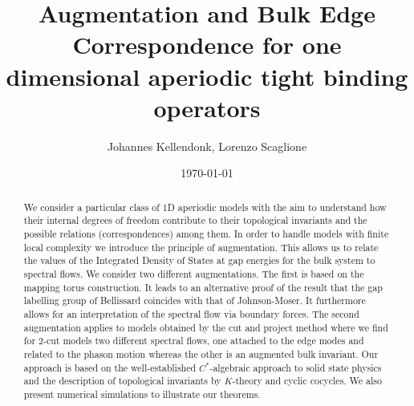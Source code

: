 \documentclass[11pt]{amsart}
\begin{document}
\title[Bulk Edge Correspondence for aperiodic tight binding operators]{Augmentation and Bulk Edge Correspondence for one dimensional aperiodic tight binding operators}
\author{Johannes Kellendonk, Lorenzo Scaglione}
\address{Institut Camille Jordan, Université Claude Bernard Lyon 1, 43 boulevard du 11 novembre 1918, F-69622 Villeurbanne Cedex}



\date{\today}%

\begin{abstract}
	We consider a particular class of 1D aperiodic models with the aim to understand how their internal degrees of freedom contribute to their topological invariants and the possible relations (correspondences) among them. In order to handle models with finite local complexity we introduce the principle of augmentation. This allows us to relate the values of the Integrated Density of States at gap energies for the bulk system to spectral flows. We consider two different augmentations. The first is based on the mapping torus construction. It leads to an alternative proof of the result that the gap labelling group of Bellissard coincides with that of Johnson-Moser. It furthermore allows for an interpretation of the spectral flow via boundary forces. The second augmentation applies to models obtained by the cut and project method where we find for 2-cut models two different spectral flows, one attached to the edge modes and related to the phason motion whereas the other is an augmented bulk invariant.  
	Our approach is based on the well-established $C^*$-algebraic approach to solid state physics and the description of topological invariants by $K$-theory and cyclic cocycles. We also present numerical simulations to illustrate our theorems.
\end{abstract}
\maketitle

\end{document}
